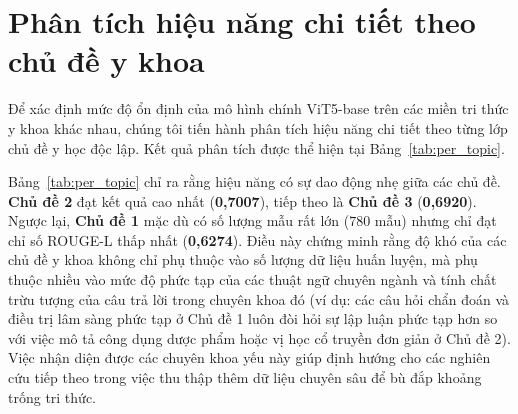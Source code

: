 \section{Phân tích hiệu năng chi tiết theo chủ đề y khoa}
Để xác định mức độ ổn định của mô hình chính ViT5-base trên các miền tri thức y khoa khác nhau, chúng tôi tiến hành phân tích hiệu năng chi tiết theo từng lớp chủ đề y học độc lập. Kết quả phân tích được thể hiện tại Bảng~\ref{tab:per_topic}.

\begin{table}[H]
\centering
\caption{Phân tích chi tiết chỉ số ROUGE-L của mô hình ViT5-base theo từng chủ đề y khoa}
\label{tab:per_topic}
\end{table}

Bảng~\ref{tab:per_topic} chỉ ra rằng hiệu năng có sự dao động nhẹ giữa các chủ đề. \textbf{Chủ đề 2} đạt kết quả cao nhất (\textbf{0,7007}), tiếp theo là \textbf{Chủ đề 3} (\textbf{0,6920}). Ngược lại, \textbf{Chủ đề 1} mặc dù có số lượng mẫu rất lớn ($780$ mẫu) nhưng chỉ đạt chỉ số ROUGE-L thấp nhất (\textbf{0,6274}). Điều này chứng minh rằng độ khó của các chủ đề y khoa không chỉ phụ thuộc vào số lượng dữ liệu huấn luyện, mà phụ thuộc nhiều vào mức độ phức tạp của các thuật ngữ chuyên ngành và tính chất trừu tượng của câu trả lời trong chuyên khoa đó (ví dụ: các câu hỏi chẩn đoán và điều trị lâm sàng phức tạp ở Chủ đề 1 luôn đòi hỏi sự lập luận phức tạp hơn so với việc mô tả công dụng dược phẩm hoặc vị học cổ truyền đơn giản ở Chủ đề 2). Việc nhận diện được các chuyên khoa yếu này giúp định hướng cho các nghiên cứu tiếp theo trong việc thu thập thêm dữ liệu chuyên sâu để bù đắp khoảng trống tri thức.